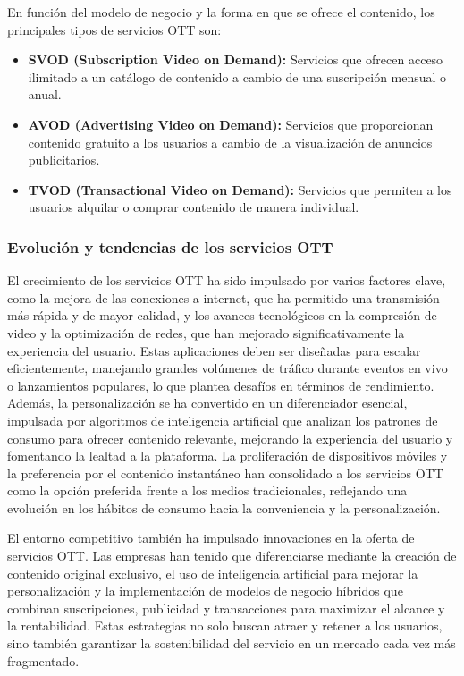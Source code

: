 En función del modelo de negocio y la forma en que se ofrece el contenido, los principales tipos de servicios OTT son:
\begin{itemize}
\item \textbf{SVOD (Subscription Video on Demand):} Servicios que ofrecen acceso ilimitado a un catálogo de contenido a cambio de una suscripción mensual o anual.
\item \textbf{AVOD (Advertising Video on Demand):} Servicios que proporcionan contenido gratuito a los usuarios a cambio de la visualización de anuncios publicitarios.
\item \textbf{TVOD (Transactional Video on Demand):} Servicios que permiten a los usuarios alquilar o comprar contenido de manera individual.
\end{itemize}

\subsubsection{Evolución y tendencias de los servicios OTT}
\label{sec:ott_evolucion_tendencias}

El crecimiento de los servicios OTT ha sido impulsado por varios factores clave, como la mejora de las conexiones a internet, que ha permitido una 
transmisión más rápida y de mayor calidad, y los avances tecnológicos en la compresión de video y la optimización de redes, que han mejorado 
significativamente la experiencia del usuario. Estas aplicaciones deben ser diseñadas para escalar eficientemente, manejando grandes volúmenes 
de tráfico durante eventos en vivo o lanzamientos populares, lo que plantea desafíos en términos de rendimiento. Además, la personalización se 
ha convertido en un diferenciador esencial, impulsada por algoritmos de inteligencia artificial que analizan los patrones de consumo para ofrecer 
contenido relevante, mejorando la experiencia del usuario y fomentando la lealtad a la plataforma. La proliferación de dispositivos móviles y la 
preferencia por el contenido instantáneo han consolidado a los servicios OTT como la opción preferida frente a los medios tradicionales, reflejando 
una evolución en los hábitos de consumo hacia la conveniencia y la personalización.

El entorno competitivo también ha impulsado innovaciones en la oferta de servicios OTT. Las empresas han tenido que diferenciarse mediante la 
creación de contenido original exclusivo, el uso de inteligencia artificial para mejorar la personalización y la implementación de modelos de 
negocio híbridos que combinan suscripciones, publicidad y transacciones para maximizar el alcance y la rentabilidad. Estas estrategias no solo 
buscan atraer y retener a los usuarios, sino también garantizar la sostenibilidad del servicio en un mercado cada vez más fragmentado.
